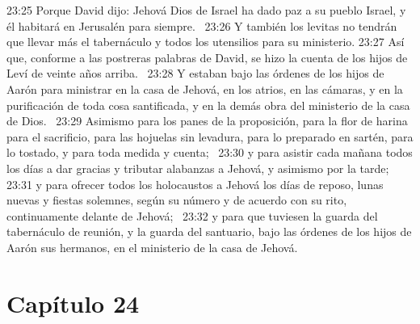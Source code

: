 23:25 Porque David dijo: Jehová Dios de Israel ha dado paz a su pueblo Israel, y él habitará en Jerusalén para siempre.  
23:26 Y también los levitas no tendrán que llevar más el tabernáculo y todos los utensilios para su ministerio. 
23:27 Así que, conforme a las postreras palabras de David, se hizo la cuenta de los hijos de Leví de veinte años arriba.  
23:28 Y estaban bajo las órdenes de los hijos de Aarón para ministrar en la casa de Jehová, en los atrios, en las cámaras, y en la purificación de toda cosa santificada, y en la demás obra del ministerio de la casa de Dios.  
23:29 Asimismo para los panes de la proposición, para la flor de harina para el sacrificio, para las hojuelas sin levadura, para lo preparado en sartén, para lo tostado, y para toda medida y cuenta;  
23:30 y para asistir cada mañana todos los días a dar gracias y tributar alabanzas a Jehová, y asimismo por la tarde;  
23:31 y para ofrecer todos los holocaustos a Jehová los días de reposo, lunas nuevas y fiestas solemnes, según su número y de acuerdo con su rito, continuamente delante de Jehová;  
23:32 y para que tuviesen la guarda del tabernáculo de reunión, y la guarda del santuario, bajo las órdenes de los hijos de Aarón sus hermanos, en el ministerio de la casa de Jehová. 
\section*{Capítulo 24 }


